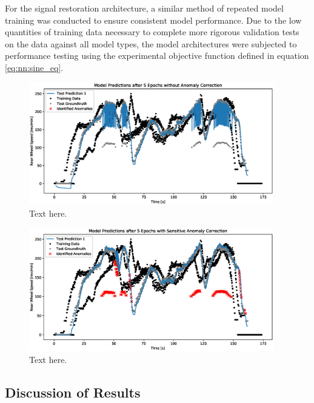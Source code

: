 \documentclass[a4paper, 10pt]{article}
\numberwithin{equation}{section}
\begin{document}
For the signal restoration architecture, a similar method of repeated model training was conducted to ensure consistent model performance. Due to the low quantities of training data necessary to complete more rigorous validation tests on the data against all model types, the model architectures were subjected to performance testing using the experimental objective function defined in equation \ref{eq:nn:sine_eq}.

 \begin{figure}[h!]
    \centering
    \includegraphics[width=0.95\textwidth]{images/NN_LSTM/lstm_nofind_anomalies.eps}
    \caption{Text here.}
    \label{fig:nn:lstm_no_anom}
\end{figure}

 \begin{figure}[h!]
    \centering
    \includegraphics[width=0.95\textwidth]{images/NN_LSTM/lstm_overfind_anomalies.eps}
    \caption{Text here.}
    \label{fig:nn:lstm_overanom}
\end{figure}

\subsection{Discussion of Results}
\label{sec:nn:discussion}
\end{document}
